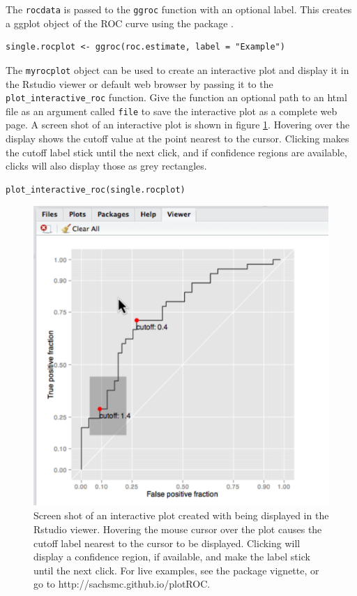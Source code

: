 \documentclass[article]{jss}
\begin{document}
The \texttt{rocdata} is passed to the \texttt{ggroc} function with an
optional label. This creates a ggplot object of the ROC curve using the
 package \citep{ggplot2}.

\begin{verbatim}
single.rocplot <- ggroc(roc.estimate, label = "Example")
\end{verbatim}

The \texttt{myrocplot} object can be used to create an interactive plot
and display it in the Rstudio viewer or default web browser by passing
it to the \texttt{plot\_interactive\_roc} function. Give the function an
optional path to an html file as an argument called \texttt{file} to
save the interactive plot as a complete web page. A screen shot of an
interactive plot is shown in figure \ref{interact}. Hovering over the
display shows the cutoff value at the point nearest to the cursor.
Clicking makes the cutoff label stick until the next click, and if
confidence regions are available, clicks will also display those as grey
rectangles.

\begin{verbatim}
plot_interactive_roc(single.rocplot)
\end{verbatim}

\begin{figure}[ht]
\centering
\includegraphics{figure/screen-shot.pdf}
\caption{Screen shot of an interactive plot created with  being displayed in the Rstudio viewer. Hovering the mouse cursor over the plot causes the cutoff label nearest to the cursor to be displayed. Clicking will display a confidence region, if available, and make the label stick until the next click. For live examples, see the package vignette, or go to http://sachsmc.github.io/plotROC. \label{interact}}
\end{figure}
\end{document}
